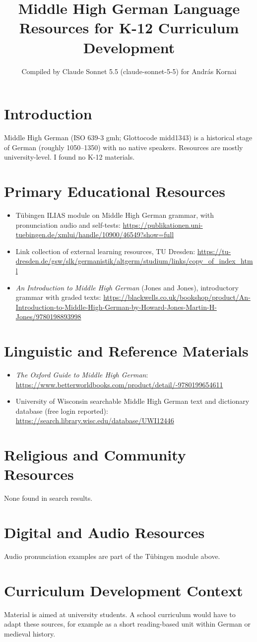 \documentclass[12pt]{article}
\title{Middle High German Language Resources for K-12 Curriculum Development}
\author{Compiled by Claude Sonnet 5.5 (claude-sonnet-5-5) for Andr\'as Kornai}
\date{}
\begin{document}
\maketitle

\section{Introduction}
Middle High German (ISO 639-3 gmh; Glottocode midd1343) is a historical stage of German (roughly 1050--1350) with no native speakers. Resources are mostly university-level. I found no K-12 materials.

\section{Primary Educational Resources}
\begin{itemize}
\item Tübingen ILIAS module on Middle High German grammar, with pronunciation audio and self-tests: \url{https://publikationen.uni-tuebingen.de/xmlui/handle/10900/46549?show=full}
\item Link collection of external learning resources, TU Dresden: \url{https://tu-dresden.de/gsw/slk/germanistik/altgerm/studium/links/copy_of_index_html}
\item \emph{An Introduction to Middle High German} (Jones and Jones), introductory grammar with graded texts: \url{https://blackwells.co.uk/bookshop/product/An-Introduction-to-Middle-High-German-by-Howard-Jones-Martin-H-Jones/9780198893998}
\end{itemize}

\section{Linguistic and Reference Materials}
\begin{itemize}
\item \emph{The Oxford Guide to Middle High German}: \url{https://www.betterworldbooks.com/product/detail/-9780199654611}
\item University of Wisconsin searchable Middle High German text and dictionary database (free login reported): \url{https://search.library.wisc.edu/database/UWI12446}
\end{itemize}

\section{Religious and Community Resources}
None found in search results.

\section{Digital and Audio Resources}
Audio pronunciation examples are part of the Tübingen module above.

\section{Curriculum Development Context}
Material is aimed at university students. A school curriculum would have to adapt these sources, for example as a short reading-based unit within German or medieval history.
\end{document}
